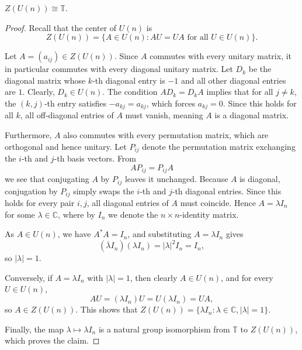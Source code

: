 \begin{proposition}
    \label{prop:center-un}
    \( Z(U(n)) \cong \mathbb{T} \).
\end{proposition}

\begin{proof}
    Recall that the center of \( U(n) \) is
    \[
        Z(U(n)) = \{ A \in U(n) : AU = UA \text{ for all } U \in U(n) \}.
    \]

    Let \( A = (a_{ij}) \in Z(U(n)) \). Since \( A \) commutes with
    every unitary matrix, it in particular commutes with every
    diagonal unitary matrix. Let \( D_k \) be the diagonal matrix
    whose \( k \)-th diagonal entry is \( -1 \) and all other
    diagonal entries are \( 1 \). Clearly, \( D_k \in U(n) \). The
    condition \( AD_k = D_kA \) implies that for all \( j \neq k \),
    the \( (k, j) \)-th entry satisfies \( -a_{kj} = a_{kj} \), which
    forces \( a_{kj} = 0 \). Since this holds for all \( k \), all
    off-diagonal entries of \( A \) must vanish, meaning \( A \) is a
    diagonal matrix.

    Furthermore, \( A \) also commutes with every permutation matrix,
    which are orthogonal and hence unitary. Let \( P_{ij} \) denote
    the permutation matrix exchanging the \( i \)-th and \( j \)-th
    basis vectors. From
    \[
        AP_{ij} = P_{ij}A
    \]
    we see that conjugating \( A \) by \( P_{ij} \) leaves it
    unchanged. Because \( A \) is diagonal, conjugation by \( P_{ij}
    \) simply swaps the \( i \)-th and \( j \)-th diagonal entries.
    Since this holds for every pair \( i,j \), all diagonal entries
    of \( A \) must coincide. Hence \( A = \lambda I_n \) for some \(
    \lambda \in \mathbb{C} \), where by \( I_{n} \) we denote the \(
    n \times n \)-identity matrix.

    As \( A \in U(n) \), we have \( A^*A = I_n \), and substituting
    \( A = \lambda I_n \) gives
    \[
        (\overline{\lambda} I_n)(\lambda I_n) = |\lambda|^2 I_n = I_n,
    \]
    so \( |\lambda| = 1 \).

    Conversely, if \( A = \lambda I_n \) with \( |\lambda| = 1 \),
    then clearly \( A \in U(n) \), and for every \( U \in U(n) \),
    \[
        AU = (\lambda I_n)U = U(\lambda I_n) = UA,
    \]
    so \( A \in Z(U(n)) \). This shows that \( Z(U(n)) = \{ \lambda
    I_n : \lambda \in \mathbb{C}, |\lambda| = 1 \} \).

    Finally, the map \( \lambda \mapsto \lambda I_n \) is a natural
    group isomorphism from \( \mathbb{T} \) to \( Z(U(n)) \), which
    proves the claim.
\end{proof}

